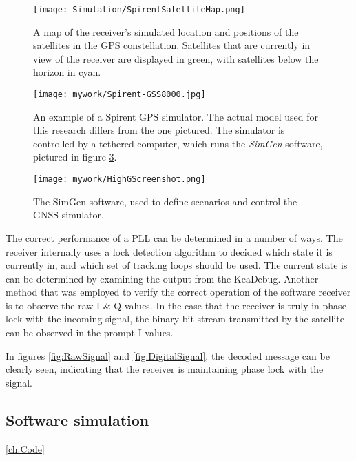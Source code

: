 \begin{figure}[!htb] 
    \centering
    \texttt{[image: Simulation/SpirentSatelliteMap.png]} 
    \caption{A map of the receiver's simulated location and positions of the satellites in the GPS constellation. Satellites that are currently in view of the receiver are displayed in green, with satellites below the horizon in cyan.}
    \label{fig:SpirentSatelliteMap}
\end{figure}




\begin{figure}[!htb] 
    \centering
    \texttt{[image: mywork/Spirent-GSS8000.jpg]} 
    \caption{An example of a Spirent \ac{GPS} simulator. The actual model used for this research differs from the one pictured. The simulator is controlled by a tethered computer, which runs the \emph{SimGen} software, pictured in figure \ref{:HighGScreenshot}.}
    \label{fig:Spirent}
\end{figure}

\begin{figure}[!htb] 
    \centering
    \texttt{[image: mywork/HighGScreenshot.png]} 
    \caption{The SimGen software, used to define scenarios and control the \ac{GNSS} simulator.}
    \label{:HighGScreenshot}
\end{figure}


The correct performance of a \ac{PLL} can be determined in a number of ways. The receiver internally uses a lock detection algorithm to decided which state it is currently in, and which set of tracking loops should be used. The current state is can be determined by examining the output from the KeaDebug. Another method that was employed to verify the correct operation of the software receiver is to observe the raw I & Q values. In the case that the receiver is truly in phase lock with the incoming signal, the binary bit-stream transmitted by the satellite can be observed in the prompt I values. 

In figures \ref{fig:RawSignal} and \ref{fig:DigitalSignal}, the decoded message can be clearly seen, indicating that the receiver is maintaining phase lock with the signal.



\subsection{Software simulation}
\ref{ch:Code}


